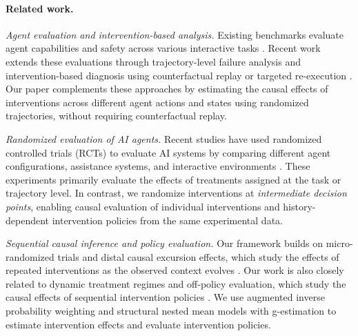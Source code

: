 \paragraph{Related work.}
{\em Agent evaluation and intervention-based analysis.}
Existing benchmarks evaluate agent capabilities and safety across various interactive tasks \citep{yao2025tau,lu2025toolsandbox,debenedetti2024agentdojo,zhong2025impossiblebench}.
Recent work extends these evaluations through trajectory-level failure analysis \citep{cemri2025mast,zhang2025whowhen} and intervention-based diagnosis using counterfactual replay or targeted re-execution \citep{ma2026dover,bonagiri2026causalflow,shah2026causalreplay,xiao2026harnesses}.
Our paper complements these approaches by estimating the causal effects of interventions across different agent actions and states using randomized trajectories, without requiring counterfactual replay.

{\em Randomized evaluation of AI agents.}
Recent studies have used randomized controlled trials (RCTs) to evaluate AI systems by comparing different agent configurations, assistance systems, and interactive environments \citep{arena2026agentarena,camuffo2026beyond,lu2026agent}.
These experiments primarily evaluate the effects of treatments assigned at the task or trajectory level.
In contrast, we randomize interventions at {\em intermediate decision points}, enabling causal evaluation of individual interventions and history-dependent intervention policies from the same experimental data.

{\em Sequential causal inference and policy evaluation.}
Our framework builds on micro-randomized trials and distal causal excursion effects, which study the effects of repeated interventions as the observed context evolves \citep{klasnja2015mrt,boruvka2018moderation,qian2025distal}.
Our work is also closely related to dynamic treatment regimes and off-policy evaluation, which study the causal effects of sequential intervention policies \citep{murphy2003dtr,jiang2016dr,uehara2026ope}.
We use augmented inverse probability weighting and structural nested mean models with g-estimation \citep{robins1994correcting,vansteelandt2014snmm,lewis2020double} to estimate intervention effects and evaluate intervention policies.